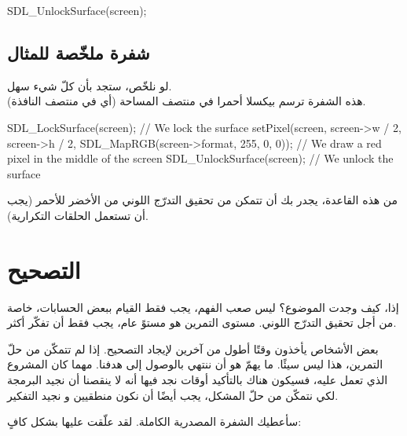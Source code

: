 \begin{Csource}
SDL_UnlockSurface(screen);
\end{Csource}

\subsection{شفرة  ملخّصة للمثال}

لو نلخّص، ستجد بأن كلّ شيء سهل.\\
هذه الشفرة ترسم بيكسلا أحمرا في منتصف المساحة
(أي في منتصف النافذة).

\begin{Csource}
SDL_LockSurface(screen); // We lock the surface
setPixel(screen, screen->w / 2, screen->h / 2, SDL_MapRGB(screen->format, 255, 0, 0)); // We draw a red pixel in the middle of the screen
SDL_UnlockSurface(screen); // We unlock the surface
\end{Csource}

من هذه القاعدة، يجدر بك أن تتمكن من تحقيق التدرّج اللوني من الأخضر للأحمر (يجب أن تستعمل الحلقات التكرارية).

\section{التصحيح}

إذا، كيف وجدت الموضوع؟ ليس صعب الفهم، يجب فقط القيام ببعض الحسابات، خاصة من أجل تحقيق التدرّج اللوني. مستوى التمرين هو مستوً عام، يجب فقط أن تفكّر أكثر. 

بعض الأشخاص يأخذون وقتًا أطول من آخرين لإيجاد التصحيح. إذا لم تتمكّن من حلّ التمرين، هذا ليس سيئًا. ما يهمّ هو أن ننتهي بالوصول إلى هدفنا. مهما كان المشروع الذي تعمل عليه، فسيكون هناك بالتأكيد أوقات نجد فيها أنه لا ينقصنا أن نجيد البرمجة لكي نتمكّن من حلّ المشكل، يجب أيضًا أن نكون منطقيين و نجيد التفكير.

سأعطيك الشفرة المصدرية الكاملة. لقد علّقت عليها بشكل كافٍ:


